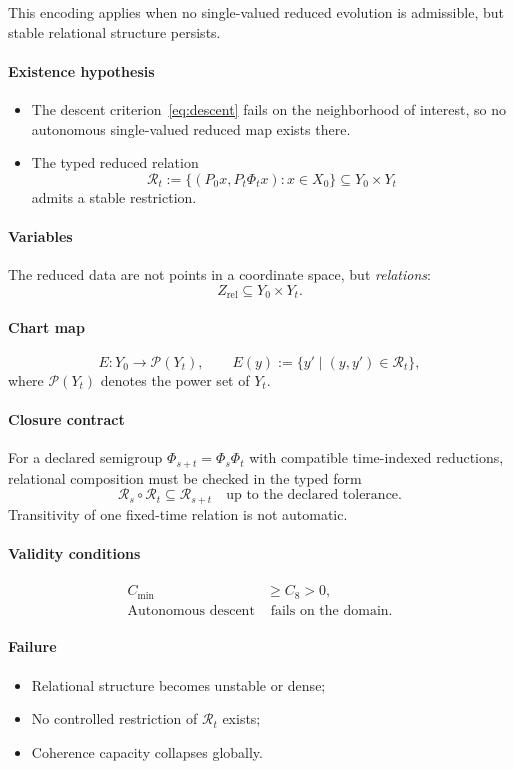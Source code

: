 \documentclass[11pt]{article}
\theoremstyle{plain}
\theoremstyle{plain}
\begin{document}
This encoding applies when no single-valued reduced evolution
is admissible, but stable relational structure persists.

\paragraph{Existence hypothesis}
\begin{itemize}
\item The descent criterion~\eqref{eq:descent} fails on the neighborhood of
interest, so no autonomous single-valued reduced map exists there.
\item The typed reduced relation
\[
\mathcal{R}_t :=
\{(P_0x,P_t\Phi_tx):x\in X_0\}\subseteq Y_0\times Y_t
\]
admits a stable restriction.
\end{itemize}

\paragraph{Variables}
The reduced data are not points in a coordinate space, but
\emph{relations}:
\[
Z_{\mathrm{rel}} \subseteq Y_0\times Y_t.
\]

\paragraph{Chart map}
\[
E : Y_0 \to \mathcal{P}(Y_t),
\qquad
E(y) := \{y' \mid (y,y')\in\mathcal{R}_t\},
\]
where $\mathcal{P}(Y_t)$ denotes the power set of $Y_t$.

\paragraph{Closure contract}
For a declared semigroup $\Phi_{s+t}=\Phi_s\Phi_t$ with compatible
time-indexed reductions, relational composition must be checked in the typed
form
\[
\mathcal{R}_s\circ\mathcal{R}_t
\subseteq \mathcal{R}_{s+t}
\quad\text{up to the declared tolerance}.
\]
Transitivity of one fixed-time relation is not automatic.

\paragraph{Validity conditions}
\begin{align}
C_{\min} &\ge C_8 > 0, \\
\text{Autonomous descent} &\text{ fails on the domain.}
\end{align}

\paragraph{Failure}
\begin{itemize}
\item Relational structure becomes unstable or dense;
\item No controlled restriction of $\mathcal{R}_t$ exists;
\item Coherence capacity collapses globally.
\end{itemize}
\end{document}

